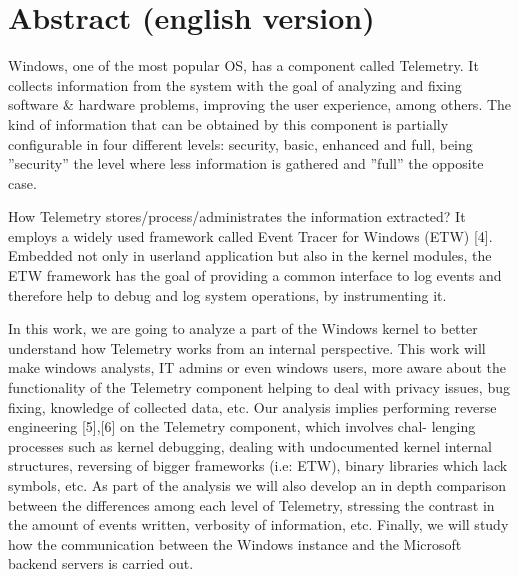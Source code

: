 \documentclass[11pt,a4paper,twoside]{tesis}
\begin{document}

\def\autor{Pablo Agustín Artuso \\ LU: 282/11 \\ artusopablo@gmail.com}
\def\tituloTesis{Studying the logging capability of Windows Telemetry component using Reverse Engineering}
\def\runtitle{}
\def\director{Rodolfo Baader $<$rbaader@dc.uba.ar$>$}
\def\codirector{Aleksandar Milenkoski $<$amilenkoski@ernw.de$>$}
\def\lugar{Buenos Aires, 2019}


\section*{Abstract (english version)}
Windows, one of the most popular OS, has a component called Telemetry. It collects information from the system with the goal of analyzing and fixing software \& hardware problems, improving the user experience, among others. The kind of information that can be obtained by this component is partially configurable in four different levels: security, basic, enhanced and full, being ”security” the level where less information is gathered and ”full” the opposite case.  

How Telemetry stores/process/administrates the information extracted? It employs a widely used framework called Event Tracer for Windows (ETW) [4]. Embedded not only in userland application but also in the kernel modules, the ETW framework has the goal of providing a common interface to log events and
therefore help to debug and log system operations, by instrumenting it.

In this work, we are going to analyze a part of the Windows kernel to better understand how Telemetry works from an internal perspective. This work will make windows analysts, IT admins or even windows users, more aware about the functionality of the Telemetry component helping to deal with privacy issues, bug fixing, knowledge of collected data, etc. Our analysis implies performing reverse engineering [5],[6] on the Telemetry component, which involves chal- lenging processes such as kernel debugging, dealing with undocumented kernel internal structures, reversing of bigger frameworks (i.e: ETW), binary libraries which lack symbols, etc. As part of the analysis we will also develop an in depth comparison between the differences among each level of Telemetry, stressing the contrast in the amount of events written, verbosity of information, etc. Finally, we will study how the communication between the Windows instance and the Microsoft backend servers is carried out.
\end{document}
